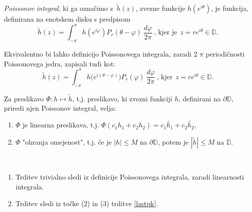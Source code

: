 \documentclass[mat1]{fmfdelo}
\begin{document}
    \begin{definicija}
        \emph{Poissonov integral}, ki ga označimo z~$\widetilde{h}(z)$, zvezne funkcije $h(e^{i\theta})$, je funkcija, definirana na enotskem disku s predpisom
        $$
        \widetilde{h}(z) = \int_{-\pi}^{\pi}{h(e^{i\varphi}) P_r(\theta - \varphi)~\frac{d\varphi}{2 \pi}}~\text{, kjer je}~~z = r e^{i\theta} \in \mathbb{D}.
        $$
     \end{definicija}
     \begin{opomba}
        Ekvivalentno bi lahko definicijo Poissonovega integrala, zaradi 2 $\pi$ periodičnosti Poissonovega jedra, zapisali tudi kot:
        $$
        \widetilde{h}(z) = \int_{-\pi}^{\pi}{h\big(e^{i(\theta-\varphi)}\big) P_r(\varphi)~\frac{d\varphi}{2 \pi}}~\text{, kjer}~~z = r e^{i\theta} \in \mathbb{D}.
        $$
     \end{opomba}
     \begin{trditev}
        \label{lastpi}
        Za preslikavo $\Phi : h \mapsto \widetilde{h}$, t.j. preslikavo, ki zvezni funkciji $h$, definirani na $\partial \mathbb{D}$, priredi njen Poissonov integral, velja:
        \begin{enumerate}
            \item $\Phi$ je linearna preslikava, t.j. $\Phi(c_1 h_1 + c_2 h_2) = c_1 \widetilde{h_1} + c_2 \widetilde{h_2}$,
            \item $\Phi$ "ohranja omejenost", t.j. če je $|h| \leq M$ na $\partial \mathbb{D}$, potem je $|\widetilde{h}| \leq M$ na $\mathbb{D}$.
        \end{enumerate}
     \end{trditev}
     \begin{dokaz}
        $ $
        \begin{enumerate}
            \item Trditev trivialno sledi iz definicije Poissonovega integrala, zaradi linearnosti integrala. 
            \item Trditev sledi iz točke (2) in (3) trditve \ref{lastpk}.
        \end{enumerate}
     \end{dokaz}
        
\end{document}
